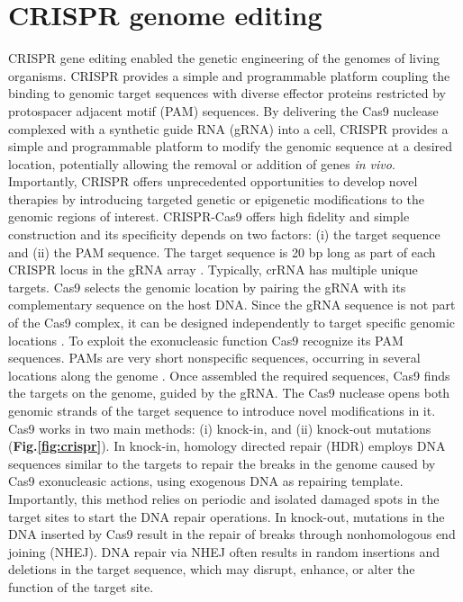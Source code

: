 \documentclass[a4paper, titlepage, openright]{book}
\newcommand{\mychapter}[2]{
    \setcounter{chapter}{#1}
    \setcounter{section}{0}
    \chapter*{#2}
    \addcontentsline{toc}{chapter}{#2}
}
\begin{document}
\mychapter{6}{CRISPR genome editing}
CRISPR gene editing \citep{cong2013multiplex} enabled the genetic engineering of the genomes of living organisms. CRISPR provides a simple and programmable platform coupling the binding to genomic target sequences with diverse effector proteins restricted by protospacer adjacent motif (PAM) sequences. By delivering the Cas9 nuclease complexed with a synthetic guide RNA (gRNA) into a cell, CRISPR provides a simple and programmable platform to modify the genomic sequence at a desired location, potentially allowing the removal or addition of genes \emph{in vivo}. Importantly, CRISPR offers unprecedented opportunities to develop novel therapies by introducing targeted genetic or epigenetic modifications to the genomic regions of interest. CRISPR-Cas9 offers high fidelity and simple construction and  its specificity depends on two factors: (i) the target sequence and (ii) the PAM sequence. The target sequence is 20 bp long as part of each CRISPR locus in the gRNA array \citep{ran2013genome}. Typically, crRNA has multiple unique targets. Cas9 selects the genomic location by pairing the gRNA with its complementary sequence on the host DNA. Since the gRNA sequence is not part of the Cas9 complex, it can be designed independently to target specific genomic locations \citep{bialk2015regulation}. To exploit the exonucleasic function Cas9 recognize its PAM sequences. PAMs are very short nonspecific sequences, occurring in several locations along the genome \citep{ran2013genome}. Once assembled the required sequences, Cas9 finds the targets on the genome, guided by the gRNA. The Cas9 nuclease opens both genomic strands of the target sequence to introduce novel modifications in it. Cas9 works in two main methods: (i) knock-in, and (ii) knock-out mutations (\textbf{Fig.\ref{fig:crispr}}). In knock-in, homology directed repair (HDR) employs  DNA sequences similar to the targets to repair the breaks in the genome caused by Cas9 exonucleasic actions, using exogenous DNA as repairing template. Importantly, this method relies on periodic and isolated damaged spots in the target sites to start the DNA repair operations. In knock-out, mutations in the DNA inserted by Cas9 result in the repair of breaks through nonhomologous end joining (NHEJ). DNA repair via NHEJ often results in random insertions and deletions in the target sequence, which may disrupt, enhance, or alter the function of the target site.
\end{document}
